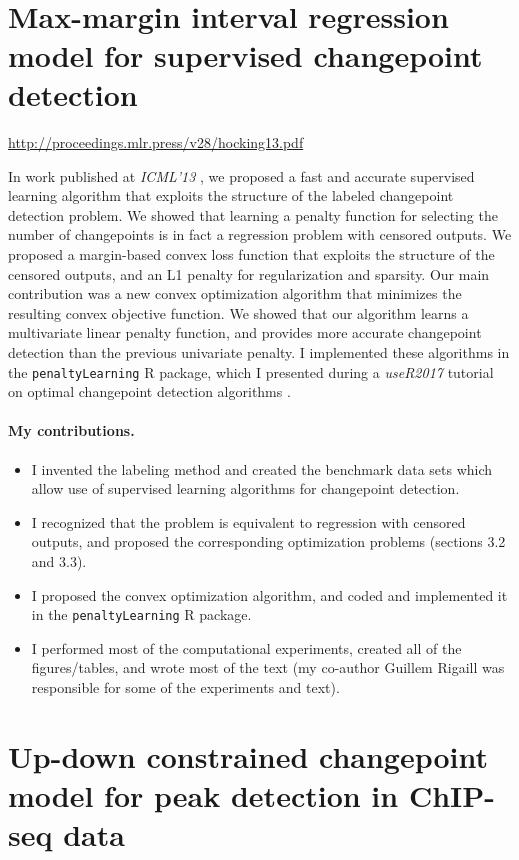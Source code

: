 \documentclass{article}
\begin{document}
\mbox{ }

\section{Max-margin interval regression model for supervised changepoint detection}

\url{http://proceedings.mlr.press/v28/hocking13.pdf}

In work published at \emph{ICML'13} \citep{HOCKING-penalties}, we
proposed a fast and accurate supervised learning algorithm
that exploits the structure of the labeled changepoint detection
problem. We showed that learning a penalty function for selecting the
number of changepoints is in fact a regression problem with censored
outputs. We proposed a margin-based convex loss function that
exploits the structure of the censored outputs, and an L1 penalty for
regularization and sparsity. Our main contribution was a new convex
optimization algorithm that minimizes the resulting convex objective
function. We showed that our algorithm learns a multivariate linear
penalty function, and provides more accurate changepoint detection
than the previous univariate penalty. I implemented these algorithms
in the \texttt{penaltyLearning} R package, which I presented during a
\emph{useR2017} tutorial on optimal changepoint detection algorithms
\citep{change-tutorial}.

\paragraph{My contributions.} 
\begin{itemize}
\item I invented the labeling method and created the benchmark data
  sets which allow use of supervised learning algorithms for
  changepoint detection.
\item I recognized that the problem is equivalent to regression with
  censored outputs, and proposed the corresponding optimization
  problems (sections 3.2 and 3.3).
\item I proposed the convex optimization algorithm, and coded and
  implemented it in the \texttt{penaltyLearning} R package.
\item I performed most of the computational experiments, created all
  of the figures/tables, and wrote most of the text (my co-author
  Guillem Rigaill was responsible for some of the experiments and
  text).
\end{itemize}

\section{Up-down constrained changepoint model for peak detection in ChIP-seq data}
\end{document}
